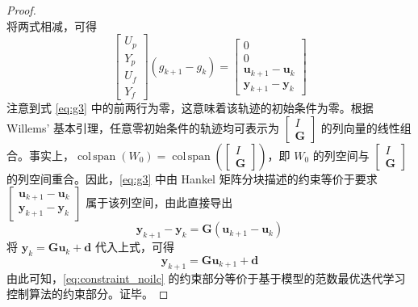 \begin{proof}
\begin{equation}
		\label{eq:g1_g2}
	\end{equation}
	将两式相减，可得
	\begin{equation}
		\begin{bmatrix} U_p \\ Y_p \\ U_f \\ Y_f \end{bmatrix} (g_{k+1}-g_k) = \begin{bmatrix} 0 \\ 0 \\ \mathbf{u}_{k+1} - \mathbf{u}_k \\ \mathbf{y}_{k+1} - \mathbf{y}_k \end{bmatrix}
		\label{eq:g3}
	\end{equation}
	注意到式 \eqref{eq:g3} 中的前两行为零，这意味着该轨迹的初始条件为零。根据 Willems' 基本引理，任意零初始条件的轨迹均可表示为 $\begin{bmatrix} I \\ \mathbf{G} \end{bmatrix}$ 的列向量的线性组合。事实上，$\operatorname{col\,span}(W_0) = \operatorname{col\,span}\!\left( \begin{bmatrix} I \\ \mathbf{G} \end{bmatrix} \right)$，即 $W_0$ 的列空间与 $\begin{bmatrix} I \\ \mathbf{G} \end{bmatrix}$ 的列空间重合。因此，\eqref{eq:g3} 中由 Hankel 矩阵分块描述的约束等价于要求 $\begin{bmatrix} \mathbf{u}_{k+1} - \mathbf{u}_k \\ \mathbf{y}_{k+1} - \mathbf{y}_k \end{bmatrix}$ 属于该列空间，由此直接导出
	\begin{equation}
		\mathbf{y}_{k+1} - \mathbf{y}_k = \mathbf{G} (\mathbf{u}_{k+1} - \mathbf{u}_k)
		\label{eq:diff_io}
	\end{equation}
	将 \( \mathbf{y}_k = \mathbf{G} \mathbf{u}_k + \mathbf{d} \) 代入上式，可得
	\begin{equation}
		\mathbf{y}_{k+1} = \mathbf{G} \mathbf{u}_{k+1} + \mathbf{d}
		\label{eq:io_relation}
	\end{equation}
	由此可知，\eqref{eq:constraint_noilc} 的约束部分等价于基于模型的范数最优迭代学习控制算法的约束部分。证毕。
\end{proof}

